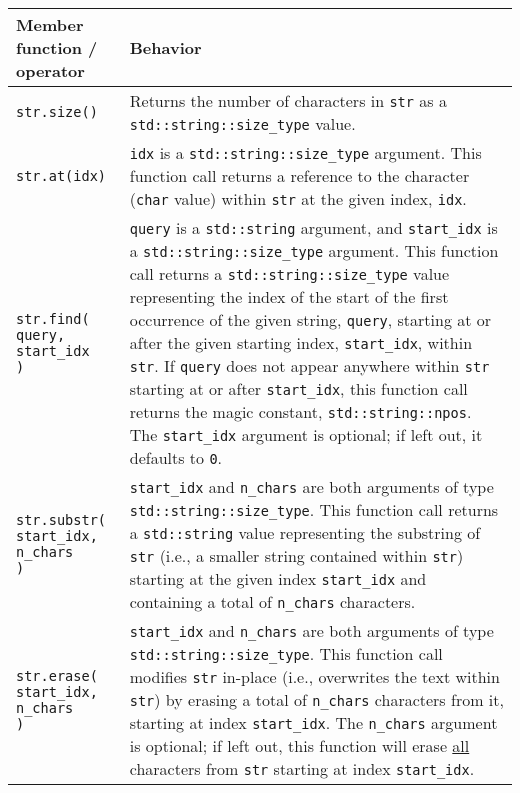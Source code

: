 \documentclass{article}
\begin{document}
\begin{tabular}{|p{}|p{}|}
    \hline
    Member function / operator & Behavior \\
    \hline
    \texttt{str.size()} & Returns the number of characters in \texttt{str} as a \texttt{std::string::size\_type} value.\\
    \hline
    \texttt{str.at(idx)} & \texttt{idx} is a \texttt{std::string::size\_type} argument. This function call returns a reference to the character (\texttt{char} value) within \texttt{str} at the given index, \texttt{idx}.\\
    \hline
    \makecell[tl]{\texttt{str.find(}\\ \texttt{\hspace{2em}query,} \\ \texttt{\hspace{2em}start\_idx} \\ \texttt{)}} & \texttt{query} is a \texttt{std::string} argument, and \texttt{start\_idx} is a \texttt{std::string::size\_type} argument. This function call returns a \texttt{std::string::size\_type} value representing the index of the start of the first occurrence of the given string, \texttt{query}, starting at or after the given starting index, \texttt{start\_idx}, within \texttt{str}. If \texttt{query} does not appear anywhere within \texttt{str} starting at or after \texttt{start\_idx}, this function call returns the magic constant, \texttt{std::string::npos}. The \texttt{start\_idx} argument is optional; if left out, it defaults to \texttt{0}. \\
    \hline
    \makecell[tl]{\texttt{str.substr(}\\ \texttt{\hspace{2em}start\_idx,} \\ \texttt{\hspace{2em}n\_chars} \\ \texttt{)}} & \texttt{start\_idx} and \texttt{n\_chars} are both arguments of type \texttt{std::string::size\_type}. This function call returns a \texttt{std::string} value representing the substring of \texttt{str} (i.e., a smaller string contained within \texttt{str}) starting at the given index \texttt{start\_idx} and containing a total of \texttt{n\_chars} characters.\\
    \hline
    \makecell[tl]{\texttt{str.erase(}\\ \texttt{\hspace{2em}start\_idx,} \\ \texttt{\hspace{2em}n\_chars} \\ \texttt{)}} & \texttt{start\_idx} and \texttt{n\_chars} are both arguments of type \texttt{std::string::size\_type}. This function call modifies \texttt{str} in-place (i.e., overwrites the text within \texttt{str}) by erasing a total of \texttt{n\_chars} characters from it, starting at index \texttt{start\_idx}. The \texttt{n\_chars} argument is optional; if left out, this function will erase \ul{all} characters from \texttt{str} starting at index \texttt{start\_idx}.\\

\end{tabular}
\end{document}
